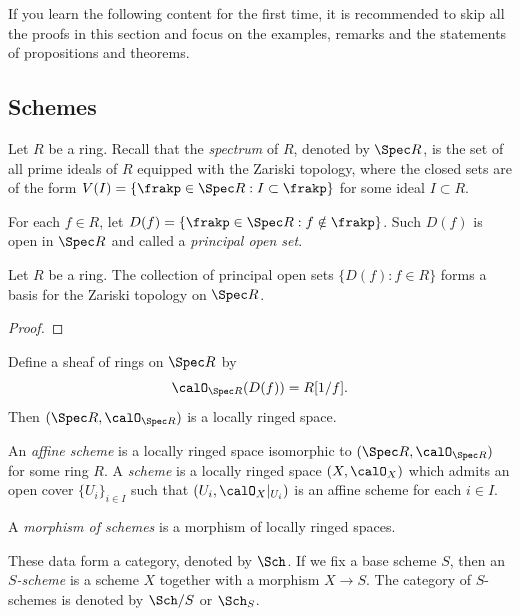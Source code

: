 If you learn the following content for the first time, it is recommended to skip all the proofs in this section and focus on the examples, remarks and the statements of propositions and theorems.

\subsection{Schemes}

    Let \(R\) be a ring.
    Recall that the \emph{spectrum} of \(R\), denoted by \(\Spec R\), is the set of all prime ideals of \(R\) equipped with the Zariski topology, 
    where the closed sets are of the form \(V(I) = \{\frakp \in \Spec R : I \subset \frakp\}\) for some ideal \(I \subset R\).

    For each \(f \in R\), let \(D(f) = \{\frakp \in \Spec R : f \notin \frakp\}\).
    Such \(D(f)\) is open in \(\Spec R\) and called a \emph{principal open set}.
    
    \begin{proposition}\label{prop:principal_open_sets_form_a_basis}
        Let \(R\) be a ring.
        The collection of principal open sets \(\{D(f) : f \in R\}\) forms a basis for the Zariski topology on \(\Spec R\).
    \end{proposition}
    \begin{proof}
    \end{proof}

    Define a sheaf of rings on \(\Spec R\) by 
    \[ \calO_{\Spec R}(D(f)) = R[1/f]. \]
    Then \((\Spec R, \calO_{\Spec R})\) is a locally ringed space.

    \begin{definition}\label{def:affine_scheme_and_scheme}
        An \emph{affine scheme} is a locally ringed space isomorphic to \((\Spec R, \calO_{\Spec R})\) for some ring \(R\).
        A \emph{scheme} is a locally ringed space \((X, \calO_X)\) which admits an open cover \(\{U_i\}_{i \in I}\) such that \((U_i, \calO_X|_{U_i})\) is an affine scheme for each \(i \in I\).

        A \emph{morphism of schemes} is a morphism of locally ringed spaces.

        These data form a category, denoted by \(\Sch\).
        If we fix a base scheme \(S\), then an \emph{\(S\)-scheme} is a scheme \(X\) together with a morphism \(X \to S\).
        The category of \(S\)-schemes is denoted by \(\Sch/S\) or \(\Sch_S\).
    \end{definition}

